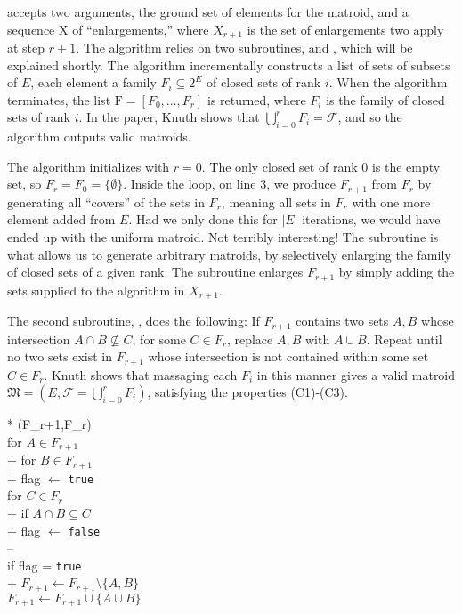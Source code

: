  accepts two arguments, the ground set of elements for the matroid, and a sequence $\mathrm{X}$ of ``enlargements,'' where $X_{r+1}$ is the set of enlargements two apply at step $r+1$. The algorithm relies on two subroutines,  and , which will be explained shortly. The algorithm incrementally constructs a list of sets of subsets of $E$, each element a family $F_i \subseteq 2^E$ of closed sets of rank $i$. When the algorithm terminates, the list $\mathrm{F} = [F_0, \ldots, F_r]$ is returned, where $F_i$ is the family of closed sets of rank $i$. In the paper, Knuth shows that $\bigcup_{i=0}^r F_i = \mathcal{F}$, and so the algorithm outputs valid matroids.

The algorithm initializes with $r = 0$. The only closed set of rank 0 is the empty set, so $F_r = F_0 = \{ \emptyset \}$. Inside the loop, on line 3, we produce $F_{r+1}$ from $F_r$ by generating all ``covers'' of the sets in $F_r$, meaning all sets in $F_r$ with one more element added from $E$. Had we only done this for $|E|$ iterations, we would have ended up with the uniform matroid. Not terribly interesting! The  subroutine is what allows us to generate arbitrary matroids, by selectively enlarging the family of closed sets of a given rank. The subroutine enlarges $F_{r+1}$ by simply adding the sets supplied to the algorithm in $X_{r+1}$.

The second subroutine, , does the following: If $F_{r+1}$ contains two sets $A,B$ whose intersection $A \cap B \not \subseteq C$, for some $C \in F_{r}$, replace $A,B$ with $A \cup B$. Repeat until no two sets exist in $F_{r+1}$ whose intersection is not contained within some set $C \in F_{r}$. Knuth shows that massaging each $F_{i}$ in this manner gives a valid matroid $\mathfrak{M} = (E, \mathcal{F} = \bigcup_{i=0}^r F_i)$, satisfying the properties (C1)-(C3).

\begin{pseudo}*
  ({F_{r+1},F_r}) \\
  for $A \in F_{r+1}$ \\+
  for $B \in F_{r+1}$ \\+
  flag $\leftarrow$ \texttt{true} \\
  for $C \in F_r$ \\+
  if $A \cap B \subseteq C$ \\+
  flag $\leftarrow$ \texttt{false} \\--
  \\
  if flag = \texttt{true} \\+
  $F_{r+1} \leftarrow F_{r+1} \setminus \{A, B \}$ \\
  $F_{r+1} \leftarrow F_{r+1} \cup \{A \cup B \}$
\end{pseudo}

